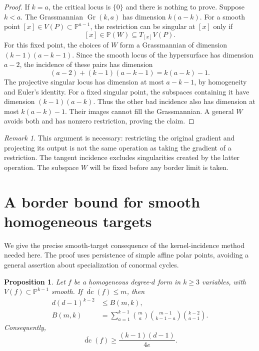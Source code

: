 \documentclass[11pt]{article}
\newtheorem{proposition}[theorem]{Proposition}
\theoremstyle{remark}\newtheorem{remark}[theorem]{Remark}
\DeclareMathOperator{\Gr}{Gr}
\DeclareMathOperator{\dc}{dc}
\newcommand{\bdc}{\overline{\dc}}
\newcommand{\PP}{\mathbb P}
\begin{document}
\begin{proof}
If $k=a$, the critical locus is $\{0\}$ and there is nothing to prove.
Suppose $k<a$. The Grassmannian $\Gr(k,a)$ has dimension $k(a-k)$.
For a smooth point $[x]\in V(P)\subset\PP^{a-1}$, the restriction can
be singular at $[x]$ only if
\[
 [x]\in\PP(W)\subseteq T_{[x]}V(P).
\]
For this fixed point, the choices of $W$ form a Grassmannian of
dimension $(k-1)(a-k-1)$. Since the smooth locus of the hypersurface
has dimension $a-2$, the incidence of these pairs has dimension
\[
 (a-2)+(k-1)(a-k-1)=k(a-k)-1.
\]
The projective singular locus has dimension at most $a-k-1$, by
homogeneity and Euler's identity. For a fixed singular point, the
subspaces containing it have dimension $(k-1)(a-k)$. Thus the other
bad incidence also has dimension at most $k(a-k)-1$. Their images
cannot fill the Grassmannian. A general $W$ avoids both and has nonzero
restriction, proving the claim.
\end{proof}

\begin{remark}
This argument is necessary: restricting the original gradient and
projecting its output is not the same operation as taking the gradient
of a restriction. The tangent incidence excludes singularities created
by the latter operation. The subspace $W$ will be fixed before any
border limit is taken.
\end{remark}

\section{A border bound for smooth homogeneous targets}

We give the precise smooth-target consequence of the kernel-incidence
method~\cite{Sheshadri} needed here. The proof uses persistence of simple
affine polar points, avoiding a general assertion about specialization
of conormal cycles.

\begin{proposition}\label{prop:polar}
Let $f$ be a homogeneous degree-$d$ form in $k\ge3$ variables, with
$V(f)\subset\PP^{k-1}$ smooth. If $\bdc(f)\le m$, then
\begin{align}
 d(d-1)^{k-2}&\le B(m,k),\label{eq:polar}\\
 B(m,k)&=\sum_{a=1}^{k-1}
 \binom ma\binom{m-1}{k-1-a}\binom{k-2}{a-1}.
 \label{eq:B}
\end{align}
Consequently,
\begin{equation}\label{eq:bridge}
 \bdc(f)\ge\frac{(k-1)(d-1)}{4e}.
\end{equation}
\end{proposition}
\end{document}
